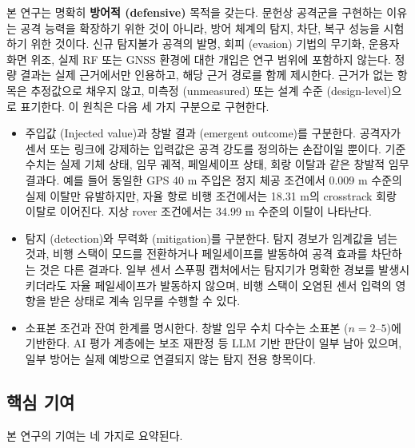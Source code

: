 본 연구는 명확히 \textbf{방어적 (defensive)} 목적을 갖는다. 문헌상 공격군을 구현하는 이유는 공격 능력을 확장하기 위한 것이 아니라, 방어 체계의 탐지, 차단, 복구 성능을 시험하기 위한 것이다. 신규 탐지불가 공격의 발명, 회피 (evasion) 기법의 무기화, 운용자 화면 위조, 실제 RF 또는 GNSS 환경에 대한 개입은 연구 범위에 포함하지 않는다.
%
정량 결과는 실제 근거에서만 인용하고, 해당 근거 경로를 함께 제시한다. 근거가 없는 항목은 추정값으로 채우지 않고, 미측정 (unmeasured) 또는 설계 수준 (design-level)으로 표기한다. 이 원칙은 다음 세 가지 구분으로 구현한다.

\begin{itemize}[leftmargin=*]
    \item 주입값 (Injected value)과 창발 결과 (emergent outcome)를 구분한다. 공격자가 센서 또는 링크에 강제하는 입력값은 공격 강도를 정의하는 손잡이일 뿐이다. 기준 수치는 실제 기체 상태, 임무 궤적, 페일세이프 상태, 회랑 이탈과 같은 창발적 임무 결과다. 예를 들어 동일한 GPS 40 m 주입은 정지 체공 조건에서 0.009 m 수준의 실제 이탈만 유발하지만, 자율 항로 비행 조건에서는 18.31 m의 crosstrack 회랑 이탈로 이어진다. 지상 rover 조건에서는 34.99 m 수준의 이탈이 나타난다.
    \item 탐지 (detection)와 무력화 (mitigation)를 구분한다. 탐지 경보가 임계값을 넘는 것과, 비행 스택이 모드를 전환하거나 페일세이프를 발동하여 공격 효과를 차단하는 것은 다른 결과다. 일부 센서 스푸핑 캡처에서는 탐지기가 명확한 경보를 발생시키더라도 자율 페일세이프가 발동하지 않으며, 비행 스택이 오염된 센서 입력의 영향을 받은 상태로 계속 임무를 수행할 수 있다.
    \item 소표본 조건과 잔여 한계를 명시한다. 창발 임무 수치 다수는 소표본 ($n=2$--$5$)에 기반한다. AI 평가 계층에는 보조 재판정 등 LLM 기반 판단이 일부 남아 있으며, 일부 방어는 실제 예방으로 연결되지 않는 탐지 전용 항목이다.
\end{itemize}


\subsection{핵심 기여}

본 연구의 기여는 네 가지로 요약된다.


